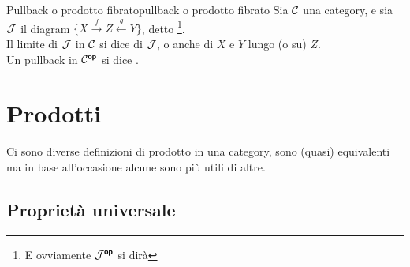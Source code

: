\documentclass{article}
\renewcommand\C{\mc{C}}
\newcommand\J{\mc{J}}
\begin{document}
\begin{definition}{Pullback o prodotto fibrato}{pullback o prodotto fibrato}
    Sia $\C$ una category, e sia $\J$ il diagram $\{ X\xrightarrow{f} Z \xleftarrow{g} Y \}$, detto \footnote{E ovviamente $\J^\op$ si dirà }.\\
    Il limite di $\J$ in $\C$ si dice  di $\J$, o anche  di $X$ e $Y$ lungo (o su) $Z$.\\
    Un pullback in $\C^\op$ si dice .
\end{definition}

\pagebreak 

\section{Prodotti}

Ci sono diverse definizioni di prodotto in una category, sono (quasi) equivalenti ma in base all'occasione alcune sono più utili di altre.

\subsection{Proprietà universale}
\end{document}
